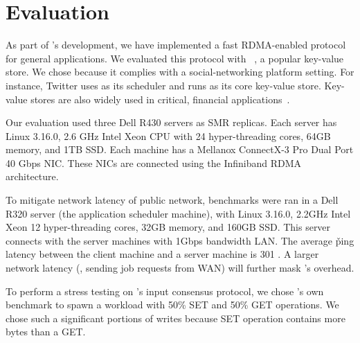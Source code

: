 \section{Evaluation} \label{sec:eval}

% 

As part of \xxx's development, we have implemented a fast RDMA-enabled \paxos 
protocol~\cite{falcon:github} for general applications. We evaluated this 
protocol with \redis~\cite{redis}, a popular key-value store. We chose \redis 
because it complies with a social-networking platform setting. For instance, 
Twitter uses \mesos as its scheduler and runs \redis as its core key-value 
store. Key-value stores are also widely used 
in critical, financial applications~\cite{nosql:finance,nosql:eval}.

Our evaluation used three Dell R430 servers as SMR replicas. Each server has 
Linux 3.16.0, 2.6 GHz Intel Xeon CPU with 24 hyper-threading cores, 64GB 
memory, and 1TB SSD. Each machine has a Mellanox ConnectX-3 Pro Dual Port 40 
Gbps NIC. These NICs are connected using the Infiniband RDMA architecture.

To mitigate network latency of public network, benchmarks were ran 
in a Dell R320 server (the application scheduler machine), with Linux 3.16.0, 
2.2GHz Intel Xeon 12 hyper-threading cores, 32GB memory, and 160GB SSD. This 
server connects with the server machines with 1Gbps bandwidth LAN. The average 
\v{ping} latency between the client machine and a server machine is 301 \us. A 
larger network latency (\eg, sending job requests from WAN) will further 
mask \xxx's overhead.

To perform a stress testing on \xxx's input consensus protocol, we chose 
\redis's own benchmark to spawn a workload with 50\% SET and 50\% GET 
operations. We chose such a significant portions of writes because SET 
operation contains more bytes than a GET.

